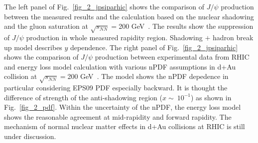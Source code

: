 The left panel of Fig.~\ref{fig_2_jpsiparhic} shows the comparison of $J/\psi$ production between the measured results and the calculation based on the nuclear shadowing and the gluon saturation  at $\sqrt{s_{NN}}=$200 GeV~\cite{bib_rhicjpsirdauvsy}. 
The results show the suppression of $J/\psi$ production in whole measured  rapidity region. 
Shadowing $+$ hadron break up model describes $y$ dependence.
The right panel of Fig.~\ref{fig_2_jpsiparhic} shows the comparison of $J/\psi$ production between experimental data from RHIC and energy loss model calculation with various nPDF assumptions in d+Au collision at $\sqrt{s_{NN}}=$200 GeV~\cite{bib_jpsipaeloss}. 
The model shows the nPDF depedence in particular considering EPS09 PDF especially backward. 
It is thought the difference of strength of the anti-shadowing region ($x\sim ~10^{-1}$) as shown in Fig.~\ref{fig_2_pdf}.
Within the uncertainty of the nPDF, the energy loss model shows the reasonable agreement at mid-rapidity and forward rapidity. 
The mechanism of normal nuclear matter effects in d+Au collisions at RHIC is still  under discussion. 

